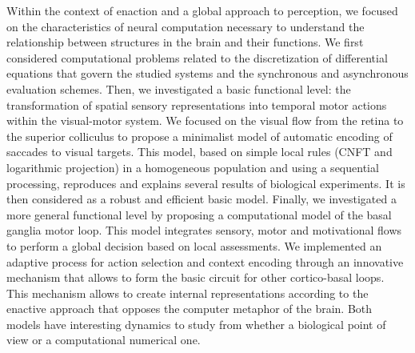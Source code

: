 \small {Within the context of enaction and a global approach to perception, we focused on the characteristics of neural computation necessary to understand the relationship between structures in the brain and their functions. We first considered computational problems related to the discretization of differential equations that govern the studied systems and the synchronous and asynchronous evaluation schemes. Then, we investigated a basic functional level: the transformation of spatial sensory representations into temporal motor actions within the visual-motor system. We focused on the visual flow from the retina to the superior colliculus to propose a minimalist model of automatic encoding of saccades to visual targets. This model, based on simple local rules (CNFT and logarithmic projection) in a homogeneous population and using a sequential processing, reproduces and explains several results of biological experiments. It is then considered as a robust and efficient basic model. Finally, we investigated a more general functional level by proposing a computational model of the basal ganglia motor loop. This model integrates sensory, motor and motivational flows to perform a global decision based on local assessments. We implemented an adaptive process for action selection and context encoding through an innovative mechanism that allows to form the basic circuit for other cortico-basal loops. This mechanism allows to create internal representations according to the enactive approach that opposes the computer metaphor of the brain. Both models have interesting dynamics to study from whether a biological point of view or a computational numerical one.}

